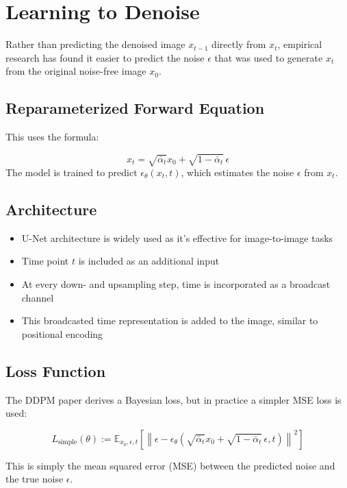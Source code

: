 \section{Learning to Denoise}

Rather than predicting the denoised image $x_{t-1}$ directly from $x_t$, empirical research has found it easier to predict the noise $\epsilon$ that was used to generate $x_t$ from the original noise-free image $x_0$.

\subsection*{Reparameterized Forward Equation}
This uses the formula:
\begin{definition}
\[
x_t = \sqrt{\bar{\alpha}_t} x_0 + \sqrt{1 - \bar{\alpha}_t} \, \epsilon
\]
The model is trained to predict $\epsilon_\theta(x_t, t)$, which estimates the noise $\epsilon$ from $x_t$.
\end{definition}

\subsection*{Architecture}
\begin{itemize}
    \item U-Net architecture is widely used as it's effective for image-to-image tasks
    \item Time point $t$ is included as an additional input
    \item At every down- and upsampling step, time is incorporated as a broadcast channel
    \item This broadcasted time representation is added to the image, similar to positional encoding
\end{itemize}

\subsection*{Loss Function}
The DDPM paper derives a Bayesian loss, but in practice a simpler MSE loss is used:
\begin{definition}
\[
L_{\text{simple}}(\theta) := \mathbb{E}_{x_0, \epsilon, t} \left[\left\| \epsilon - \epsilon_\theta\left(\sqrt{\bar{\alpha}_t} x_0 + \sqrt{1 - \bar{\alpha}_t} \, \epsilon, t \right) \right\|^2 \right]
\]
\end{definition}
This is simply the mean squared error (MSE) between the predicted noise and the true noise $\epsilon$.

